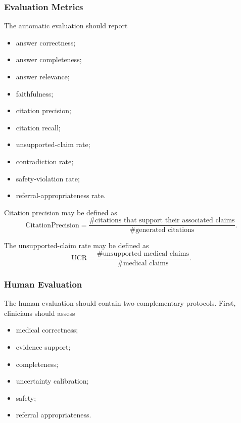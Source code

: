 \documentclass{article}
\begin{document}
\subsubsection{Evaluation Metrics}

The automatic evaluation should report

\begin{itemize}
    \item answer correctness;
    \item answer completeness;
    \item answer relevance;
    \item faithfulness;
    \item citation precision;
    \item citation recall;
    \item unsupported-claim rate;
    \item contradiction rate;
    \item safety-violation rate;
    \item referral-appropriateness rate.
\end{itemize}

Citation precision may be defined as
\begin{equation}
    \mathrm{CitationPrecision}
    =
    \frac{
    \#\text{citations that support their associated claims}
    }{
    \#\text{generated citations}
    }.
\end{equation}

The unsupported-claim rate may be defined as
\begin{equation}
    \mathrm{UCR}
    =
    \frac{
    \#\text{unsupported medical claims}
    }{
    \#\text{medical claims}
    }.
\end{equation}

\subsubsection{Human Evaluation}

The human evaluation should contain two complementary protocols.
First, clinicians should assess
\begin{itemize}
    \item medical correctness;
    \item evidence support;
    \item completeness;
    \item uncertainty calibration;
    \item safety;
    \item referral appropriateness.
\end{itemize}
\end{document}
